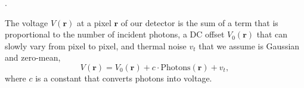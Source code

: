





. 

The voltage $V(\mathbf{r})$ at a pixel $\mathbf{r}$ of our detector is the sum of a term that is proportional to the number of incident photons, a DC offset $V_0(\mathbf{r})$ that can slowly vary from pixel to pixel, and thermal noise $v_t$ that we assume is Gaussian and zero-mean,
\begin{equation}
V(\mathbf{r})=V_0(\mathbf{r})+c \cdot \text{Photons}(\mathbf{r}) +v_t,
\end{equation}
where $c$ is a constant that converts photons into voltage. 


